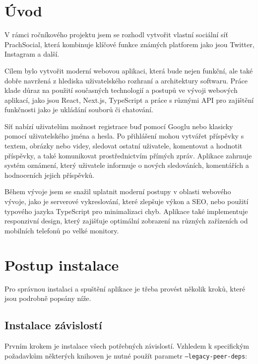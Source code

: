 \documentclass[12pt]{article}
\begin{document}
\newpage

\renewcommand{\contentsname}{Obsah}
\setcounter{tocdepth}{2}
\tableofcontents

\newpage
{}
\section{Úvod}

V rámci ročníkového projektu jsem se rozhodl vytvořit vlastní sociální síť PrachSocial, která kombinuje klíčové funkce známých platforem jako jsou Twitter, Instagram a další.

Cílem bylo vytvořit moderní webovou aplikaci, která bude nejen funkční, ale také dobře navržená z hlediska uživatelského rozhraní a architektury softwaru. Práce klade důraz na použití současných technologií a postupů ve vývoji webových aplikací, jako jsou React, Next.js, TypeScript a práce s různými API pro zajištění funkčnosti jako je ukládání souborů či chatování.

Síť nabízí uživatelům možnost registrace buď pomocí Googlu nebo klasicky pomocí uživatelského jména a hesla. Po přihlášení mohou vytvářet příspěvky s textem, obrázky nebo videy, sledovat ostatní uživatele, komentovat a hodnotit příspěvky, a také komunikovat prostřednictvím přímých zpráv. Aplikace zahrnuje systém oznámení, který uživatele informuje o nových sledováních, komentářích a hodnoceních jejich příspěvků.

Během vývoje jsem se snažil uplatnit moderní postupy v oblasti webového vývoje, jako je serverové vykreslování, které zlepšuje výkon a SEO, nebo použití typového jazyka TypeScript pro minimalizaci chyb. Aplikace také implementuje responzivní design, který zajišťuje optimální zobrazení na různých zařízeních od mobilních telefonů po velké monitory.

\newpage
\section{Postup instalace}

Pro správnou instalaci a spuštění aplikace je třeba provést několik kroků, které jsou podrobně popsány níže.

\subsection{Instalace závislostí}

Prvním krokem je instalace všech potřebných závislostí. Vzhledem k specifickým požadavkům některých knihoven je nutné použít parametr \texttt{--legacy-peer-deps}:
\end{document}
